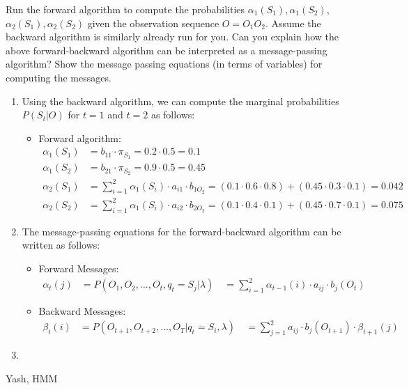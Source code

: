 \begin{parts}
    \begin{subparts}
    \subpart[1] Run the forward algorithm to compute the  probabilities $\alpha_1(S_1), \alpha_1(S_2)$, $\alpha_2(S_1), \alpha_2(S_2)$ given the observation sequence $O=O_1 O_2$.
    \addpoints
    \subpart[1] Assume the backward algorithm is similarly already run for you. Can you explain how the above forward-backward algorithm can be interpreted as a message-passing algorithm? Show the message passing equations (in terms of variables) for computing the messages. 
    \addpoints
    \end{subparts}
    \begin{soln}
        \begin{enumerate}
            \item Using the backward algorithm, we can compute the marginal probabilities $P(S_t|O)$ for $t=1$ and $t=2$ as follows:
            \begin{itemize}
                \item Forward algorithm:
                    \begin{align*}
                    \alpha_1(S_1) &= b_{11} \cdot \pi_{S_1} = 0.2 \cdot 0.5 = 0.1\\
                    \alpha_1(S_2) &= b_{21} \cdot \pi_{S_2} = 0.9 \cdot 0.5 = 0.45\\
                    \alpha_2(S_1) &= \sum_{i=1}^2 \alpha_1(S_i) \cdot a_{i1} \cdot b_{1O_2} = (0.1 \cdot 0.6 \cdot 0.8) + (0.45 \cdot 0.3 \cdot 0.1) = 0.042\\
                    \alpha_2(S_2) &= \sum_{i=1}^2 \alpha_1(S_i) \cdot a_{i2} \cdot b_{2O_2} = (0.1 \cdot 0.4 \cdot 0.1) + (0.45 \cdot 0.7 \cdot 0.1) = 0.075
                    \end{align*}
            \end{itemize}
            \item The message-passing equations for the forward-backward algorithm can be written as follows:
            \begin{itemize}
                \item Forward Messages:
                \begin{align}
                \alpha_t(j) &= P(O_1, O_2, \ldots, O_t, q_t = S_j | \lambda) \
                &= \sum_{i=1}^2 \alpha_{t-1}(i) \cdot a_{ij} \cdot b_{j}(O_t)
                \end{align}
                \item Backward Messages:
                \begin{align}
                \beta_t(i) &= P(O_{t+1}, O_{t+2}, \ldots, O_T | q_t = S_i, \lambda) \
                &= \sum_{j=1}^2 a_{ij} \cdot b_j(O_{t+1}) \cdot \beta_{t+1}(j)
                \end{align}
            \end{itemize}
            \item 
        \end{enumerate}
    \end{soln}
    \begin{qauthor}
        Yash, HMM
    \end{qauthor}

\end{parts}
